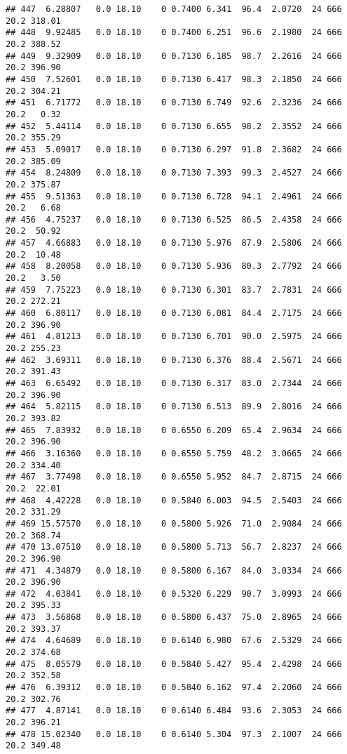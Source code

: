 \documentclass[
]{article}
\begin{document}
\begin{verbatim}
## 447  6.28807   0.0 18.10    0 0.7400 6.341  96.4  2.0720  24 666    20.2 318.01
## 448  9.92485   0.0 18.10    0 0.7400 6.251  96.6  2.1980  24 666    20.2 388.52
## 449  9.32909   0.0 18.10    0 0.7130 6.185  98.7  2.2616  24 666    20.2 396.90
## 450  7.52601   0.0 18.10    0 0.7130 6.417  98.3  2.1850  24 666    20.2 304.21
## 451  6.71772   0.0 18.10    0 0.7130 6.749  92.6  2.3236  24 666    20.2   0.32
## 452  5.44114   0.0 18.10    0 0.7130 6.655  98.2  2.3552  24 666    20.2 355.29
## 453  5.09017   0.0 18.10    0 0.7130 6.297  91.8  2.3682  24 666    20.2 385.09
## 454  8.24809   0.0 18.10    0 0.7130 7.393  99.3  2.4527  24 666    20.2 375.87
## 455  9.51363   0.0 18.10    0 0.7130 6.728  94.1  2.4961  24 666    20.2   6.68
## 456  4.75237   0.0 18.10    0 0.7130 6.525  86.5  2.4358  24 666    20.2  50.92
## 457  4.66883   0.0 18.10    0 0.7130 5.976  87.9  2.5806  24 666    20.2  10.48
## 458  8.20058   0.0 18.10    0 0.7130 5.936  80.3  2.7792  24 666    20.2   3.50
## 459  7.75223   0.0 18.10    0 0.7130 6.301  83.7  2.7831  24 666    20.2 272.21
## 460  6.80117   0.0 18.10    0 0.7130 6.081  84.4  2.7175  24 666    20.2 396.90
## 461  4.81213   0.0 18.10    0 0.7130 6.701  90.0  2.5975  24 666    20.2 255.23
## 462  3.69311   0.0 18.10    0 0.7130 6.376  88.4  2.5671  24 666    20.2 391.43
## 463  6.65492   0.0 18.10    0 0.7130 6.317  83.0  2.7344  24 666    20.2 396.90
## 464  5.82115   0.0 18.10    0 0.7130 6.513  89.9  2.8016  24 666    20.2 393.82
## 465  7.83932   0.0 18.10    0 0.6550 6.209  65.4  2.9634  24 666    20.2 396.90
## 466  3.16360   0.0 18.10    0 0.6550 5.759  48.2  3.0665  24 666    20.2 334.40
## 467  3.77498   0.0 18.10    0 0.6550 5.952  84.7  2.8715  24 666    20.2  22.01
## 468  4.42228   0.0 18.10    0 0.5840 6.003  94.5  2.5403  24 666    20.2 331.29
## 469 15.57570   0.0 18.10    0 0.5800 5.926  71.0  2.9084  24 666    20.2 368.74
## 470 13.07510   0.0 18.10    0 0.5800 5.713  56.7  2.8237  24 666    20.2 396.90
## 471  4.34879   0.0 18.10    0 0.5800 6.167  84.0  3.0334  24 666    20.2 396.90
## 472  4.03841   0.0 18.10    0 0.5320 6.229  90.7  3.0993  24 666    20.2 395.33
## 473  3.56868   0.0 18.10    0 0.5800 6.437  75.0  2.8965  24 666    20.2 393.37
## 474  4.64689   0.0 18.10    0 0.6140 6.980  67.6  2.5329  24 666    20.2 374.68
## 475  8.05579   0.0 18.10    0 0.5840 5.427  95.4  2.4298  24 666    20.2 352.58
## 476  6.39312   0.0 18.10    0 0.5840 6.162  97.4  2.2060  24 666    20.2 302.76
## 477  4.87141   0.0 18.10    0 0.6140 6.484  93.6  2.3053  24 666    20.2 396.21
## 478 15.02340   0.0 18.10    0 0.6140 5.304  97.3  2.1007  24 666    20.2 349.48

\end{verbatim}
\end{document}
